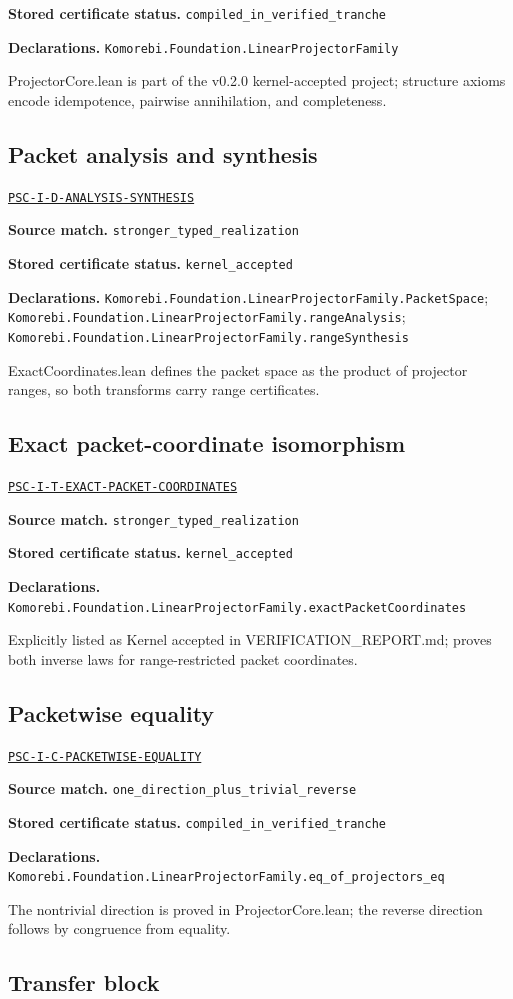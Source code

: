\documentclass[a4paper,11pt]{article}
\newcommand{\field}[2]{\par\smallskip\noindent\textbf{#1.} #2\par}
\begin{document}
\field{Stored certificate status}{\nolinkurl{compiled_in_verified_tranche}}
\field{Declarations}{\nolinkurl{Komorebi.Foundation.LinearProjectorFamily}}
ProjectorCore.lean is part of the v0.2.0 kernel-accepted project; structure axioms encode idempotence, pairwise annihilation, and completeness.
\subsection*{Packet analysis and synthesis}
\hyperref[rec:PSC-I-D-ANALYSIS-SYNTHESIS]{\nolinkurl{PSC-I-D-ANALYSIS-SYNTHESIS}}
\field{Source match}{\nolinkurl{stronger_typed_realization}}
\field{Stored certificate status}{\nolinkurl{kernel_accepted}}
\field{Declarations}{\nolinkurl{Komorebi.Foundation.LinearProjectorFamily.PacketSpace}; \nolinkurl{Komorebi.Foundation.LinearProjectorFamily.rangeAnalysis}; \nolinkurl{Komorebi.Foundation.LinearProjectorFamily.rangeSynthesis}}
ExactCoordinates.lean defines the packet space as the product of projector ranges, so both transforms carry range certificates.
\subsection*{Exact packet-coordinate isomorphism}
\hyperref[rec:PSC-I-T-EXACT-PACKET-COORDINATES]{\nolinkurl{PSC-I-T-EXACT-PACKET-COORDINATES}}
\field{Source match}{\nolinkurl{stronger_typed_realization}}
\field{Stored certificate status}{\nolinkurl{kernel_accepted}}
\field{Declarations}{\nolinkurl{Komorebi.Foundation.LinearProjectorFamily.exactPacketCoordinates}}
Explicitly listed as Kernel accepted in VERIFICATION\_REPORT.md; proves both inverse laws for range-restricted packet coordinates.
\subsection*{Packetwise equality}
\hyperref[rec:PSC-I-C-PACKETWISE-EQUALITY]{\nolinkurl{PSC-I-C-PACKETWISE-EQUALITY}}
\field{Source match}{\nolinkurl{one_direction_plus_trivial_reverse}}
\field{Stored certificate status}{\nolinkurl{compiled_in_verified_tranche}}
\field{Declarations}{\nolinkurl{Komorebi.Foundation.LinearProjectorFamily.eq_of_projectors_eq}}
The nontrivial direction is proved in ProjectorCore.lean; the reverse direction follows by congruence from equality.
\subsection*{Transfer block}
\end{document}
